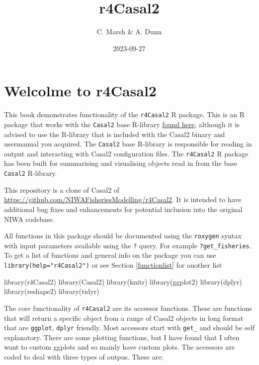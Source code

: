 \documentclass[
]{book}
\title{r4Casal2}
\author{C. Marsh \& A. Dunn}
\date{2023-09-27}
\newenvironment{Shaded}{\begin{snugshade}}{\end{snugshade}}
\newcommand{\FunctionTok}[1]{\textcolor[rgb]{0.00,0.00,0.00}{#1}}
\newcommand{\NormalTok}[1]{#1}
\begin{document}
\maketitle

{
\setcounter{tocdepth}{1}
\tableofcontents
}
\hypertarget{welcolme-to-r4casal2}{%
\chapter{\texorpdfstring{Welcolme to \textbf{r4Casal2}}{Welcolme to r4Casal2}}\label{welcolme-to-r4casal2}}

This book demonstrates functionality of the \texttt{r4Casal2} R package. This is an R package that works with the \texttt{Casal2} base R-library \href{https://github.com/alistairdunn1/CASAL2/tree/master/R-libraries}{found here}, although it is advised to use the R-library that is included with the Casal2 binary and usermanual you acquired. The \texttt{Casal2} base R-library is responsible for reading in output and interacting with Casal2 configuration files. The \texttt{r4Casal2} R package has been built for summarising and visualising objects read in from the base \texttt{Casal2} R-library.

This repository is a clone of Casal2 of \url{https://github.com/NIWAFisheriesModelling/r4Casal2}. It is intended to have additional bug fixes and enhancements for potential inclusion into the original NIWA codebase.

All functions in this package should be documented using the \texttt{roxygen} syntax with input parameters available using the \texttt{?} query. For example \texttt{?get\_fisheries}. To get a list of functions and general info on the package you can use \texttt{library(help="r4Casal2")} or see Section \ref{functionlist} for another list

\begin{Shaded}
\begin{Highlighting}[]
\FunctionTok{library}\NormalTok{(r4Casal2)}
\FunctionTok{library}\NormalTok{(Casal2)}
\FunctionTok{library}\NormalTok{(knitr)}
\FunctionTok{library}\NormalTok{(ggplot2)}
\FunctionTok{library}\NormalTok{(dplyr)}
\FunctionTok{library}\NormalTok{(reshape2)}
\FunctionTok{library}\NormalTok{(tidyr)}
\end{Highlighting}
\end{Shaded}

The core functionality of \texttt{r4Casal2} are its accessor functions. These are functions that will return a specific object from a range of Casal2 objects in long format that are \texttt{ggplot}, \texttt{dplyr} friendly. Most accessors start with \texttt{get\_} and should be self explanatory. There are some plotting functions, but I have found that I often want to custom ggplots and so mainly have custom plots. The accessors are coded to deal with three types of outpus. These are;
\end{document}
